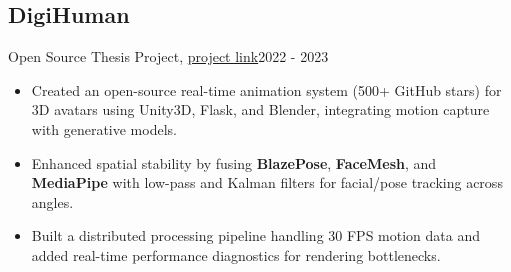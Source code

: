\subsection{DigiHuman}{Open Source Thesis Project, \href{https://github.com/Danial-Kord/DigiHuman}{project link}}{2022 - 2023}
\begin{itemize}
    \item Created an open-source real-time animation system (500+ GitHub stars) for 3D avatars using Unity3D, Flask, and Blender, integrating motion capture with generative models.
    \item Enhanced spatial stability by fusing \textbf{BlazePose}, \textbf{FaceMesh}, and \textbf{MediaPipe} with low-pass and Kalman filters for facial/pose tracking across angles.
    \item Built a distributed processing pipeline handling 30 FPS motion data and added real-time performance diagnostics for rendering bottlenecks.
\end{itemize}

